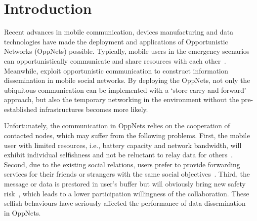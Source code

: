 \section{Introduction}
\label{sec:intro}
Recent advances in mobile communication,
devices manufacturing and data technologies have
made the deployment and applications of Opportunistic Networks
(OppNets) possible.
Typically,
mobile users in the emergency scenarios can
opportunistically communicate and share
resources with each other~\cite{DBLP:journals/tsc/KhalidKKZ14,
DBLP:journals/tmc/ChatzopoulosAKH18,
DBLP:journals/tmc/LiQJHW014}.
Meanwhile,
\cite{DBLP:journals/tmc/HanHKMSS12}
exploit opportunistic communication
to construct information
dissemination in mobile
social networks.
By deploying the OppNets,
not only the ubiquitous communication can be
implemented with a `store-carry-and-forward' approach,
but also the temporary networking
in the environment without the pre-established infrastructures
becomes more likely.

Unfortunately,
the communication in OppNets relies on
the cooperation of contacted nodes,
which may suffer from the following problems.
First,
the mobile user with limited resources,
i.e.,
battery capacity
and network bandwidth,
will exhibit individual selfishness and not be
reluctant to relay data for others~\cite{DBLP:journals/comsur/JedariXN18}.
Second,
due to the existing social relations,
users prefer to
provide forwarding services for their friends or strangers
with the same social objectives~\cite{DBLP:journals/tmc/HanHKMSS12}.
Third,
the message or data is prestored in user's buffer
but will obviously bring new safety risk~\cite{Saha2018Design},
which leads to a lower participation willingness of the collaboration.
These selfish behaviours have seriously
affected the performance
of data dissemination in OppNets.



